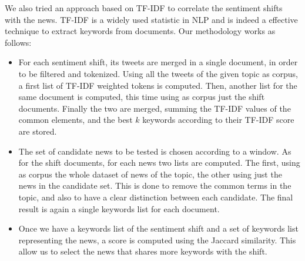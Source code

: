 We also tried an approach based on TF-IDF to correlate the sentiment shifts with the news. TF-IDF is a widely used statistic in NLP and is indeed a effective technique to extract keywords from documents. Our methodology works as follows:
\begin{itemize}
\item For each sentiment shift, its tweets are merged in a single document, in order to be filtered and tokenized. Using all the tweets of the given topic as corpus, a first list of TF-IDF weighted tokens is computed. Then, another list for the same document is computed, this time using as corpus just the shift documents. Finally the two are merged, summing the TF-IDF values of the common elements, and the best $k$ keywords according to their TF-IDF score are stored.
\item The set of candidate news to be tested is chosen according to a window. As for the shift documents, for each news two lists are computed. The first, using as corpus the whole dataset of news of the topic, the other using just the news in the candidate set. This is done to remove the common terms in the topic, and also to have a clear distinction between each candidate. The final result is again a single keywords list for each document.
\item Once we have a keywords list of the sentiment shift and a set of keywords list representing the news, a score is computed using the Jaccard similarity. This allow us to select the news that shares more keywords with the shift.
\end{itemize}
